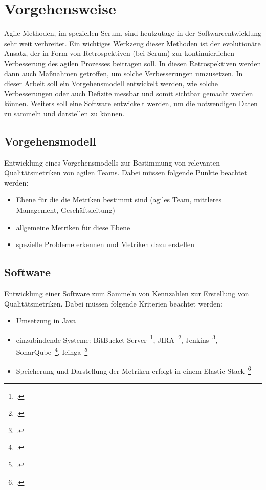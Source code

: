 \chapter{Vorgehensweise}

Agile Methoden, im speziellen Scrum, sind heutzutage in der Softwareentwicklung sehr weit verbreitet.
Ein wichtiges Werkzeug dieser Methoden ist der evolutionäre Ansatz, der in Form von Retrospektiven (bei Scrum) zur kontinuierlichen Verbesserung des agilen Prozesses beitragen soll.
In diesen Retrospektiven werden dann auch Maßnahmen getroffen, um solche Verbesserungen umzusetzen.
In dieser Arbeit soll ein Vorgehensmodell entwickelt werden, wie solche Verbesserungen oder auch Defizite messbar und somit sichtbar gemacht werden können.
Weiters soll eine Software entwickelt werden, um die notwendigen Daten zu sammeln und darstellen zu können.

\section{Vorgehensmodell}

Entwicklung eines Vorgehensmodells zur Bestimmung von relevanten Qualitätsmetriken von agilen Teams.
Dabei müssen folgende Punkte beachtet werden:
\begin{itemize}[noitemsep]
    \item Ebene für die die Metriken bestimmt sind (agiles Team, mittleres Management, Geschäftsleitung)
    \item allgemeine Metriken für diese Ebene
    \item spezielle Probleme erkennen und Metriken dazu erstellen
\end{itemize}

\section{Software}

Entwicklung einer Software zum Sammeln von Kennzahlen zur Erstellung von Qualitätsmetriken. 
Dabei müssen folgende Kriterien beachtet werden:
\begin{itemize}[noitemsep]
    \item Umsetzung in Java
    \item einzubindende Systeme: BitBucket Server~\footcite{bitbucket_server}, JIRA~\footcite{jira}, Jenkins~\footcite{jenkins}, SonarQube~\footcite{sonarqube}, Icinga~\footcite{icinga}
    \item Speicherung und Darstellung der Metriken erfolgt in einem Elastic Stack~\footcite{elastic_stack}
\end{itemize}
